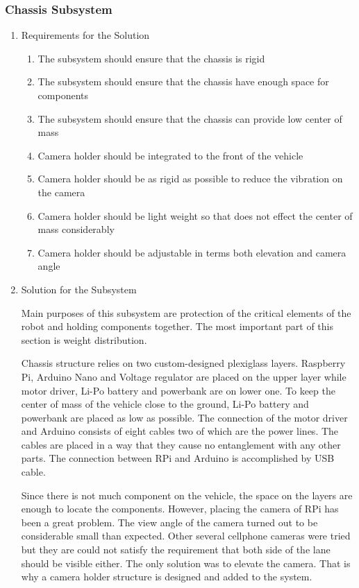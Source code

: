 \documentclass[a4paper,12pt]{article}
\begin{document}
\subsubsection{Chassis Subsystem}
	\begin{enumerate}
		\item {Requirements for the Solution}
		
		\begin{enumerate}
			\item The subsystem should ensure that the chassis is rigid 
			\item The subsystem should ensure that the chassis have enough space for components
			\item The subsystem should ensure that the chassis can provide low center of mass 
			\item Camera holder should be integrated to the front of the vehicle
			\item Camera holder should be as rigid as possible to reduce the vibration on the camera
			\item Camera holder should be light weight so that does not effect the center of mass considerably
			\item Camera holder should be adjustable in terms both elevation and camera angle
		\end{enumerate}


	\item {Solution for the Subsystem}

		Main purposes of this subsystem are protection of the critical elements of the robot and holding components together. The most important part of this section is weight distribution.

		Chassis structure relies on two custom-designed plexiglass layers. Raspberry Pi, Arduino Nano and Voltage regulator are placed on the upper layer while motor driver, Li-Po battery and powerbank are on lower one. To keep the center of mass of the vehicle close to the ground, Li-Po battery and powerbank are placed as low as possible. The connection of the motor driver and Arduino consists of eight cables two of which are the power lines. The cables are placed in a way that they cause no entanglement with any other parts. The connection between RPi and Arduino is accomplished by USB cable. 

		Since there is not much component on the vehicle, the space on the layers are enough to locate the components. However, placing the camera of RPi has been a great problem. The view angle of the camera turned out to be considerable small than expected. Other several cellphone cameras were tried but they are could not satisfy the requirement that both side of the lane should be visible either. The only solution was to elevate the camera. That is why a camera holder structure is designed and added to the system.


\end{enumerate}
\end{document}
